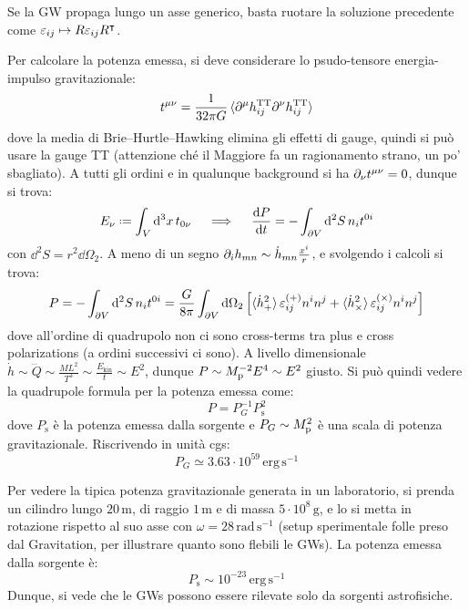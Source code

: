 \begin{example}{}{}
  Se la GW propaga lungo un asse generico, basta ruotare la soluzione precedente come $ \varepsilon_{ij} \mapsto R \varepsilon_{ij} R^\intercal $.
\end{example}

Per calcolare la potenza emessa, si deve considerare lo psudo-tensore energia-impulso gravitazionale:
\begin{equation*}
  t^{\mu \nu} = \frac{1}{32 \pi G} \braket{\partial^\mu h_{ij}^\text{TT} \partial^\nu h_{ij}^\text{TT}}
\end{equation*}
dove la media di Brie--Hurtle--Hawking elimina gli effetti di gauge, quindi si può usare la gauge TT (attenzione ché il Maggiore fa un ragionamento strano, un po' sbagliato). A tutti gli ordini e in qualunque background si ha $ \partial_\nu t^{\mu \nu} = 0 $, dunque si trova:
\begin{equation*}
  E_\nu \defeq \int_V \dd^3x \, t_{0\nu}
  \quad \implies \quad
  \frac{\dd P}{\dd t} = - \int_{\pa V} \dd^2S \, n_i t^{0i}
\end{equation*}
con $ \dd^2S = r^2 \dd \Omega_2 $.
A meno di un segno $ \partial_i h_{mn} \sim \dot{h}_{mn} \frac{x^i}{r} $, e svolgendo i calcoli si trova:
\begin{equation*}
  P = - \int_{\partial V} \mathrm{d}^2S \, n_i t^{0i} = \frac{G}{8\pi} \int_{\partial V} \mathrm{d} \Omega_2 \left[ \braket{\dot{h}_+^2} \varepsilon_{ij}^{(+)} n^i n^j + \braket{\dot{h}_\times^2} \varepsilon_{ij}^{(\times)} n^i n^j \right]
\end{equation*}
dove all'ordine di quadrupolo non ci sono cross-terms tra plus e cross polarizations (a ordini successivi ci sono). A livello dimensionale $ \dot{h} \sim \dddot{Q} \sim \frac{M L^2}{T^3} \sim \frac{E_\text{kin}}{t} \sim E^2 $, dunque $ P \sim M_\text{p}^{-2} E^4 \sim E^2 $ giusto. Si può quindi vedere la quadrupole formula per la potenza emessa come:
\begin{equation}
  P = P_G^{-1} P_\text{s}^2
\end{equation}
dove $ P_\text{s} $ è la potenza emessa dalla sorgente e $ P_G \sim M_\text{p}^2 $ è una scala di potenza gravitazionale. Riscrivendo in unità cgs:
\begin{equation}
  P_G \simeq 3.63 \cdot 10^{59} \,\text{erg} \, \text{s}^{-1}
\end{equation}

\begin{example}{}{}
  Per vedere la tipica potenza gravitazionale generata in un laboratorio, si prenda un cilindro lungo $ 20 \,\text{m} $, di raggio $ 1 \,\text{m} $ e di massa $ 5 \cdot 10^8 \,\text{g} $, e lo si metta in rotazione rispetto al suo asse con $ \omega = 28 \,\text{rad} \,\text{s}^{-1} $ (setup sperimentale folle preso dal Gravitation, per illustrare quanto sono flebili le GWs). La potenza emessa dalla sorgente è:
  \begin{equation*}
    P_\text{s} \sim 10^{-23} \,\text{erg} \,\text{s}^{-1}
  \end{equation*}
  Dunque, si vede che le GWs possono essere rilevate solo da sorgenti astrofisiche.
\end{example}

